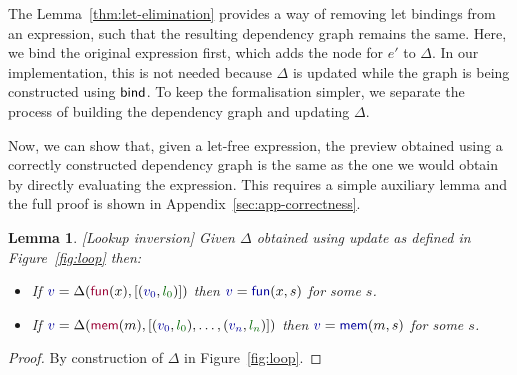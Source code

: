 \documentclass[sigplan,10pt]{acmart}\settopmatter{printfolios=true,printccs=false,printacmref=false}
\newcounter{thc}
\theoremstyle{plain}
\newtheorem{lem}[thc]{Lemma}
\theoremstyle{definition}
\newcommand{\ident}[1]{\textnormal{\sffamily #1}}
\newcommand{\bndclr}[1]{\textcolor{kvdclr}{#1}}
\newcommand{\blblclr}[1]{\textcolor{numclr}{#1}}
\newcommand{\bnd}[1]{\textnormal{\textcolor{kvdclr}{\sffamily #1}}}
\newcommand{\bknd}[1]{\textnormal{\textcolor{prepclr}{\sffamily #1}}}
\begin{document}
The Lemma~\ref{thm:let-elimination} provides a way of removing let bindings from an expression,
such that the resulting dependency graph remains the same. Here, we bind the original expression
first, which adds the node for $e'$ to $\Delta$. In our implementation, this is not needed
because $\Delta$ is updated while the graph is being constructed using $\ident{bind}$. 
To keep the formalisation simpler, we separate the process of building the dependency graph 
and updating $\Delta$. 

Now, we can show that, given a let-free expression, the preview obtained using a correctly
constructed dependency graph is the same as the one we would obtain by directly evaluating the
expression. This requires a simple auxiliary lemma and the full proof is shown in 
Appendix~\ref{sec:app-correctness}.

\begin{lem}
\label{thm:lemma-lookup}[Lookup inversion]
Given $\Delta$ obtained using \ident{update} as defined in Figure~\ref{fig:loop} then: 
\begin{itemize}
\raggedright
\item[--] If $\bndclr{v}=\Delta(\bknd{fun}(x),[(\bndclr{v_0}, \blblclr{l_0})])$
then $\bndclr{v}=\bnd{fun}(x, s)$ for some $s$. 
\item[--] If $\bndclr{v}=\Delta(\bknd{mem}(m),[(\bndclr{v_0}, \blblclr{l_0}), \ldots, (\bndclr{v_n}, \blblclr{l_n})])$
then $\bndclr{v}=\bnd{mem}(m, s)$ for some $s$. 
\end{itemize}
\end{lem}
\begin{proof}
By construction of $\Delta$ in Figure~\ref{fig:loop}.  
\end{proof}
\end{document}

